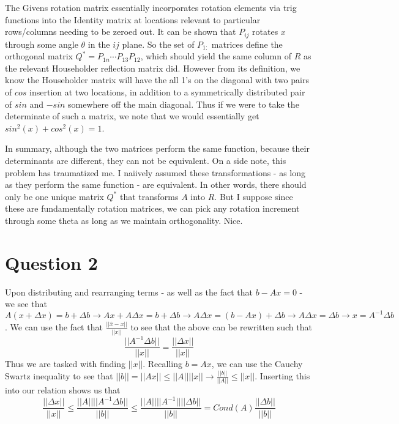 \documentclass[a4paper,12pt]{article}
\begin{document}
The Givens rotation matrix essentially incorporates rotation elements via trig functions into the Identity matrix at locations relevant to particular rows/columns needing to be zeroed out. It can be shown that $P_{ij}$ rotates $x$ through some angle $\theta$ in the $ij$ plane. So the set of $P_{1:}$ matrices define the orthogonal matrix $Q^*=P_{1n}\cdots P_{13}P_{12}$, which should yield the same column of $R$ as the relevant Householder reflection matrix did. However from its definition, we know the Householder matrix will have the all 1's on the diagonal with two pairs of $cos$ insertion at two locations, in addition to a symmetrically distributed pair of $sin$ and $-sin$ somewhere off the main diagonal. Thus if we were to take the determinate of such a matrix, we note that we would essentially get $sin^2(x)+cos^2(x)=1$. 

In summary, although the two matrices perform the same function, because their determinants are different, they can not be equivalent. On a side note, this problem has traumatized me. I naiively assumed these transformations - as long as they perform the same function - are equivalent. In other words, there should only be one unique matrix $Q^*$  that transforms $A$ into $R$. But I suppose since these are fundamentally rotation matrices, we can pick any rotation increment through some theta as long as we maintain orthogonality. Nice.

\section{Question 2}

Upon distributing and rearranging terms - as well as the fact that $b-Ax=0$ - we see that $A(x+\Delta x)=b+\Delta b \rightarrow Ax+A\Delta x = b+ \Delta b \rightarrow A\Delta x =(b-Ax) +\Delta b \rightarrow A\Delta x=\Delta b \rightarrow x=A^{-1}\Delta b$. We can use the fact that $\frac{|| \hat{x}-x ||}{||x||}$ to see that the above can be rewritten such that
\begin{equation}
\frac{||A^{-1}\Delta b||}{||x||} = \frac{||\Delta x||}{||x||}
\end{equation} Thus we are tasked with finding $||x||$. Recalling $b=Ax$, we can use the Cauchy Swartz inequality to see that $||b||=||Ax|| \leq ||A|| ||x|| \rightarrow \frac{||b||}{||A||}\leq||x||$. Inserting this into our relation shows us that
\begin{equation}
\frac{||\Delta x||}{||x||} \leq \frac{||A|| ||A^{-1} \Delta b||}{||b||} \leq  \frac{||A|| ||A^{-1} || || \Delta b||}{||b||} = Cond(A)\frac{|| \Delta b||}{||b||}
\end{equation}
\end{document}
